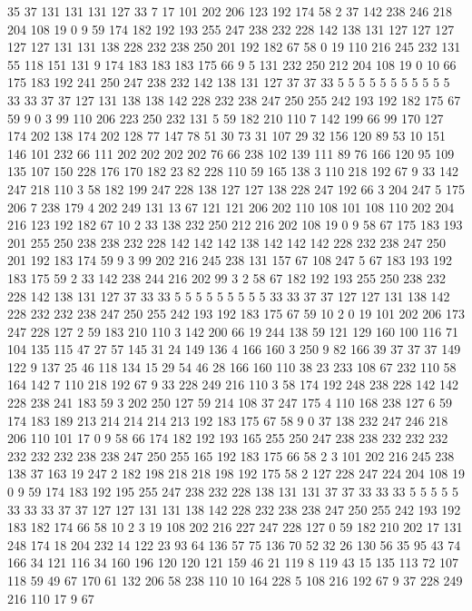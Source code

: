 35 37 131 131 131 127 33 7 17 101 202 206 123 192 174 58 2 37 142 238
246 218 204 108 19 0 9 59 174 182 192 193 255 247 238 232 228 142 138 131
127 127 127 127 127 131 131 138 228 232 238 250 201 192 182 67 58 0 19 110
216 245 232 131 55 118 151 131 9 174 183 183 183 175 66 9 5 131 232 250
212 204 108 19 0 10 66 175 183 192 241 250 247 238 232 142 138 131 127 37
37 33 5 5 5 5 5 5 5 5 5 5 5 33 33 37 37 127 131 138
138 142 228 232 238 247 250 255 242 193 192 182 175 67 59 9 0 3 99 110
206 223 250 232 131 5 59 182 210 110 7 142 199 66 99 170 127 174 202 138
174 202 128 77 147 78 51 30 73 31 107 29 32 156 120 89 53 10 151 146
101 232 66 111 202 202 202 202 76 66 238 102 139 111 89 76 166 120 95 109
135 107 150 228 176 170 182 23 82 228 110 59 165 138 3 110 218 192 67 9
33 142 247 218 110 3 58 182 199 247 228 138 127 127 138 228 247 192 66 3
204 247 5 175 206 7 238 179 4 202 249 131 13 67 121 121 206 202 110 108
101 108 110 202 204 216 123 192 182 67 10 2 33 138 232 250 212 216 202 108
19 0 9 58 67 175 183 193 201 255 250 238 238 232 228 142 142 142 138 142
142 142 228 232 238 247 250 201 192 183 174 59 9 3 99 202 216 245 238 131
157 67 108 247 5 67 183 193 192 183 175 59 2 33 142 238 244 216 202 99
3 2 58 67 182 192 193 255 250 238 232 228 142 138 131 127 37 33 33 5
5 5 5 5 5 5 5 5 33 33 37 37 127 127 131 138 142 228 232 232
238 247 250 255 242 193 192 183 175 67 59 10 2 0 19 101 202 206 173 247
228 127 2 59 183 210 110 3 142 200 66 19 244 138 59 121 129 160 100 116
71 104 135 115 47 27 57 145 31 24 149 136 4 166 160 3 250 9 82 166
39 37 37 37 149 122 9 137 25 46 118 134 15 29 54 46 28 166 160 110
38 23 233 108 67 232 110 58 164 142 7 110 218 192 67 9 33 228 249 216
110 3 58 174 192 248 238 228 142 142 228 238 241 183 59 3 202 250 127 59
214 108 37 247 175 4 110 168 238 127 6 59 174 183 189 213 214 214 214 213
192 183 175 67 58 9 0 37 138 232 247 246 218 206 110 101 17 0 9 58
66 174 182 192 193 165 255 250 247 238 238 232 232 232 232 232 232 238 238 247
250 255 165 192 183 175 66 58 2 3 101 202 216 245 238 138 37 163 19 247
2 182 198 218 218 198 192 175 58 2 127 228 247 224 204 108 19 0 9 59
174 183 192 195 255 247 238 232 228 138 131 131 37 37 33 33 33 5 5 5
5 5 33 33 33 37 37 127 127 131 131 138 142 228 232 238 238 247 250 255
242 193 192 183 182 174 66 58 10 2 3 19 108 202 216 227 247 228 127 0
59 182 210 202 17 131 248 174 18 204 232 14 122 23 93 64 136 57 75 136
70 52 32 26 130 56 35 95 43 74 166 34 121 116 34 160 196 120 120 121
159 46 21 119 8 119 43 15 135 113 72 107 118 59 49 67 170 61 132 206
58 238 110 10 164 228 5 108 216 192 67 9 37 228 249 216 110 17 9 67
